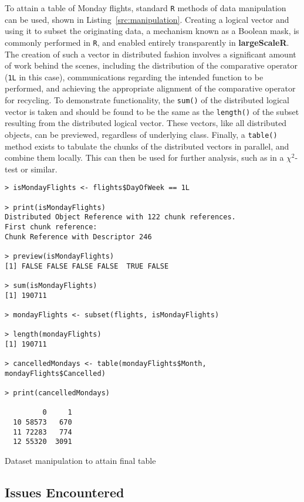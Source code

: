To attain a table of Monday flights, standard \texttt{R} methods of data manipulation can be used, shown in Listing~\ref{src:manipulation}.
Creating a logical vector and using it to subset the originating data, a mechanism known as a Boolean mask, is commonly performed in \texttt{R}, and enabled entirely transparently in \textbf{largeScaleR}.
The creation of such a vector in distributed fashion involves a significant amount of work behind the scenes, including the distribution of the comparative operator (\texttt{1L} in this case), communications regarding the intended function to be performed, and achieving the appropriate alignment of the comparative operator for recycling.
To demonstrate functionality, the \texttt{sum()} of the distributed logical vector is taken and should be found to be the same as the \texttt{length()} of the subset resulting from the distributed logical vector.
These vectors, like all distributed objects, can be previewed, regardless of underlying class.
Finally, a \texttt{table()} method exists to tabulate the chunks of the distributed vectors in parallel, and combine them locally.
This can then be used for further analysis, such as in a \(\chi^2\)-test or similar.

\begin{listing}%
\begin{verbatim}
> isMondayFlights <- flights$DayOfWeek == 1L

> print(isMondayFlights)
Distributed Object Reference with 122 chunk references.
First chunk reference:
Chunk Reference with Descriptor 246

> preview(isMondayFlights)
[1] FALSE FALSE FALSE FALSE  TRUE FALSE

> sum(isMondayFlights)
[1] 190711

> mondayFlights <- subset(flights, isMondayFlights)

> length(mondayFlights)
[1] 190711

> cancelledMondays <- table(mondayFlights$Month, mondayFlights$Cancelled)

> print(cancelledMondays)

         0     1
  10 58573   670
  11 72283   774
  12 55320  3091
\end{verbatim}
\caption{Dataset manipulation to attain final table}\label{src:manipulation}
\end{listing}

\subsection{Issues Encountered}\label{sec:sys-imp}

